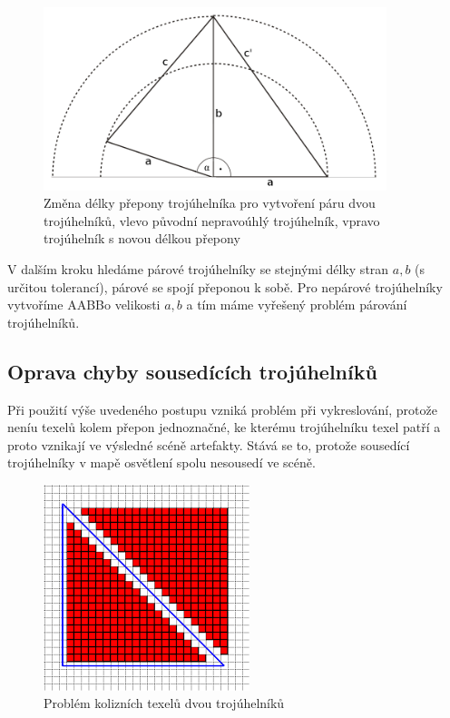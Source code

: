 \documentclass[11pt,twoside,a4paper]{book}
\begin{document}
\begin{center}
\begin{figure}[h]
\includegraphics[width=100mm]{figures/triangle.png}
\caption{Změna délky přepony trojúhelníka pro vytvoření páru dvou trojúhelníků, vlevo původní nepravoúhlý trojúhelník, vpravo trojúhelník s novou délkou přepony}
\end{figure}
\end{center}

V dalším kroku hledáme párové trojúhelníky se stejnými délky stran $a, b$ (s určitou tolerancí), párové se spojí přeponou k sobě. Pro nepárové trojúhelníky vytvoříme AABB\linebreak o velikosti $a, b$ a tím máme vyřešený problém párování trojúhelníků.
\newpage

\subsection{Oprava chyby sousedících trojúhelníků}
Při použití výše uvedeného postupu vzniká problém při vykreslování, protože není\linebreak u texelů kolem přepon jednoznačné, ke kterému trojúhelníku texel patří a proto vznikají ve výsledné scéně artefakty. Stává se to, protože sousedící trojúhelníky v mapě osvětlení spolu nesousedí ve scéně.

\begin{center}
\begin{figure}[h]
\includegraphics[width=60mm]{figures/lmfix.png}
\caption{Problém kolizních texelů dvou trojúhelníků}
\end{figure}
\end{center}
\end{document}
